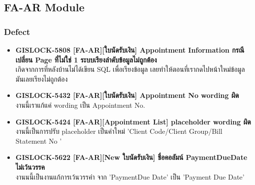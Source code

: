 \subsection{FA-AR Module}

\subsubsection{Defect}
\begin{itemize}
    \setlength\itemsep{1em}
    \item \textbf{{GISLOCK-5808 [FA-AR][ใบนัดรับเงิน] Appointment Information กรณีเปลี่ยน Page ที่ไม่ใช่ 1 ระบบเรียงลำดับข้อมูลไม่ถูกต้อง}} \\
          เกิดจากการที่หลังบ้านไม่ได้เขียน SQL เพื่อเรียงข้อมูล เลยทำให้ตอนที่เรากดไปหน้าใหม่ข้อมูลมันเลยเรียงไม่ถูกต้อง
    \item \textbf{{GISLOCK-5432 [FA-AR][ใบนัดรับเงิน] Appointment No wording ผิด}} \\
          งานนี้เราแก้แค่ wording เป็น Appointment No.     
    \item \textbf{{GISLOCK-5424 [FA-AR][Appointment List] placeholder wording ผิด}} \\
          งานนี้เป็นการปรับ placeholder เป็นคำใหม่ 'Client Code/Client Group/Bill Statement No '
    \item \textbf{{GISLOCK-5622 [FA-AR][New ใบนัดรับเงิน] ชื่อคอลัมน์ PaymentDueDate ไม่เว้นวรรค}} \\
          งานนนี้เป็นงานแก้การเว้นวรรคำ จาก 'PaymentDue Date' เป็น 'Payment Due Date'
\end{itemize}
